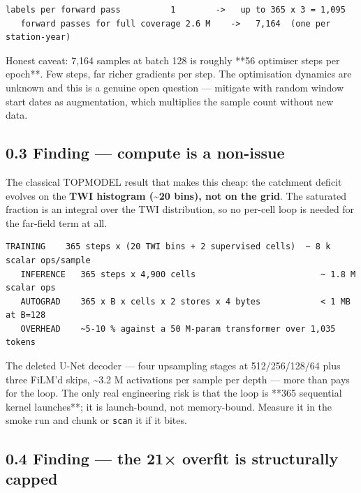 \documentclass[10pt,a4paper]{article}
\begin{document}
\begin{Verbatim}[fontsize=\scriptsize,frame=leftline,framerule=0.6pt,rulecolor=\color{rulegray},xleftmargin=6pt,framesep=6pt,]
   labels per forward pass          1        ->   up to 365 x 3 = 1,095
   forward passes for full coverage 2.6 M    ->   7,164  (one per station-year)
\end{Verbatim}

Honest caveat: 7,164 samples at batch 128 is roughly **56 optimiser steps per
epoch**. Few steps, far richer gradients per step. The optimisation dynamics are
unknown and this is a genuine open question — mitigate with random window start
dates as augmentation, which multiplies the sample count without new data.

\subsection*{0.3 Finding — compute is a non-issue}

The classical TOPMODEL result that makes this cheap: the catchment deficit
evolves on the \textbf{TWI histogram (\textasciitilde{}20 bins), not on the grid}. The saturated
fraction is an integral over the TWI distribution, so no per-cell loop is needed
for the far-field term at all.

\begin{Verbatim}[fontsize=\scriptsize,frame=leftline,framerule=0.6pt,rulecolor=\color{rulegray},xleftmargin=6pt,framesep=6pt,]
   TRAINING    365 steps x (20 TWI bins + 2 supervised cells)  ~ 8 k scalar ops/sample
   INFERENCE   365 steps x 4,900 cells                         ~ 1.8 M scalar ops
   AUTOGRAD    365 x B x cells x 2 stores x 4 bytes            < 1 MB at B=128
   OVERHEAD    ~5-10 % against a 50 M-param transformer over 1,035 tokens
\end{Verbatim}

The deleted U-Net decoder — four upsampling stages at 512/256/128/64 plus three
FiLM'd skips, \textasciitilde{}3.2 M activations per sample per depth — more than pays for the
loop. The only real engineering risk is that the loop is **365 sequential kernel
launches**; it is launch-bound, not memory-bound. Measure it in the smoke run
and chunk or \texttt{scan} it if it bites.

\subsection*{0.4 Finding — the 21× overfit is structurally capped}
\end{document}
